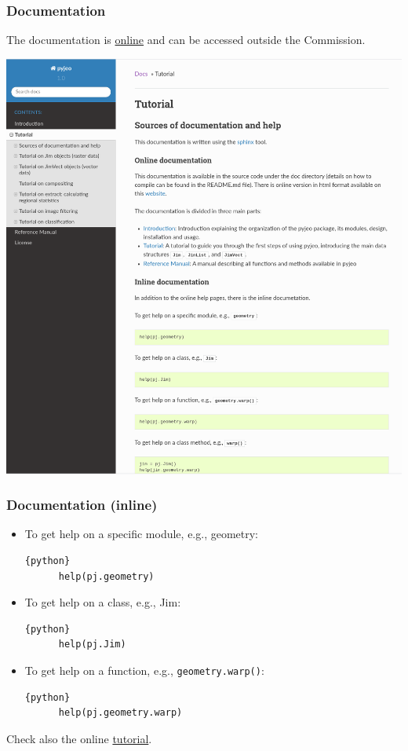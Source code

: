 \documentclass[11pt, handout, aspectratio=169]{beamer}
\begin{document}
\begin{frame}[fragile]
  \frametitle{Documentation}
  \vspace{7mm}

  The documentation is \href{https://jeodpp.jrc.ec.europa.eu/services/processing/pyjeohelp/index.html}{online} and can be accessed outside the Commission.
  \vspace{7mm}
	\begin{center}
		\includegraphics[height=0.7 \textheight]{figures/documentation}
	\end{center}
\end{frame}

\begin{frame}[fragile]
  \frametitle{Documentation (inline)}
  \begin{itemize}
  \item To get help on a specific module, e.g., geometry:
    \begin{lstlisting}{python}
      help(pj.geometry)
    \end{lstlisting}
  \item To get help on a class, e.g., Jim:
    \begin{lstlisting}{python}
      help(pj.Jim)
    \end{lstlisting}
  \item To get help on a function, e.g., \lstinline{geometry.warp()}:
    \begin{lstlisting}{python}
      help(pj.geometry.warp)
    \end{lstlisting}
  \end{itemize}

  \vspace{2mm}
  Check also the online \href{https://jeodpp.jrc.ec.europa.eu/services/processing/pyjeohelp/2_tutorial.html}{tutorial}.
  \vspace{2mm}
\end{frame}
\end{document}
